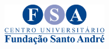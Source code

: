 \documentclass[
	12pt,				%
	oneside,			%
	a4paper,			%
	brazil				%
]{abntex2}
\begin{document}

\frenchspacing 

\pretextual
\begin{figure}[H]
\centering %
\includegraphics[width=4.5cm, height=2cm]{images/logo-fsa.jpg}\\
\end{figure}
\imprimircapa

\imprimirfolhaderosto





\end{document}
